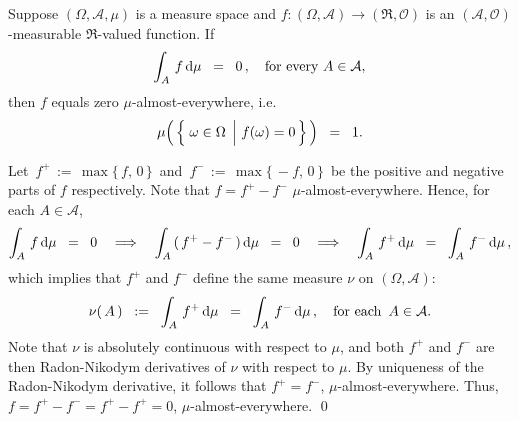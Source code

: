 \begin{corollary}
\label{Corollary:AlmostEverywhereZero}
\mbox{}\vskip 0.2cm
\noindent
Suppose $(\Omega,\mathcal{A},\mu)$ is a measure space and
$f : (\Omega,\mathcal{A}) \longrightarrow (\Re,\mathcal{O})$
is an $(\mathcal{A},\mathcal{O})$-measurable $\Re$-valued function.
If
\begin{equation*}
\int_{A}\,f\,\textnormal{d}\mu \;\;=\;\; 0\,,
\quad
\textnormal{for every $A \in \mathcal{A}$},
\end{equation*}
then $f$ equals zero $\mu$-almost-everywhere, i.e.
\begin{equation*}
\mu\!\left(\,\left\{\,\left.\omega\overset{{\color{white}.}}{\in}\Omega\;\,\right\vert\,f(\omega)=0\,\right\}\,\right)
\;\; = \;\; 1.
\end{equation*}
\end{corollary}
\proof
Let \,$f^{+} \,:=\, \max\{\,f,\,0\,\}$\, and \,$f^{-} \,:=\, \max\{\,-f,\,0\,\}$\, be the positive and negative parts of $f$ respectively.
Note that $f = f^{+} - f^{-}$ $\mu$-almost-everywhere.
Hence, for each $A \in \mathcal{A}$,
\begin{equation*}
\int_{A}\,f\,\textnormal{d}\mu \;\;=\;\; 0
\quad\Longrightarrow\quad
\int_{A}\,(\,f^{+}-f^{-}\,)\,\textnormal{d}\mu \;\;=\;\; 0
\quad\Longrightarrow\quad
\int_{A}\,f^{+}\,\textnormal{d}\mu \;\;=\;\; \int_{A}\,f^{-}\,\textnormal{d}\mu\,,
\end{equation*}
which implies that $f^{+}$ and $f^{-}$ define the same measure $\nu$ on $(\Omega,\mathcal{A})$:
\begin{equation*}
\nu(\,A\,)
	\;\; := \;\; \int_{A}\,f^{+}\,\textnormal{d}\mu \;\; = \;\; \int_{A}\,f^{-}\,\textnormal{d}\mu\,,
\quad
\textnormal{for each \,$A \in \mathcal{A}$}.
\end{equation*}
Note that $\nu$ is absolutely continuous with respect to $\mu$, and
both $f^{+}$ and $f^{-}$ are then Radon-Nikodym derivatives of $\nu$ with respect to $\mu$.
By uniqueness of the Radon-Nikodym derivative, it follows that $f^{+} = f^{-}$, $\mu$-almost-everywhere.
Thus, $f = f^{+} - f^{-} = f^{+} - f^{+} = 0$, $\mu$-almost-everywhere.
\qed


